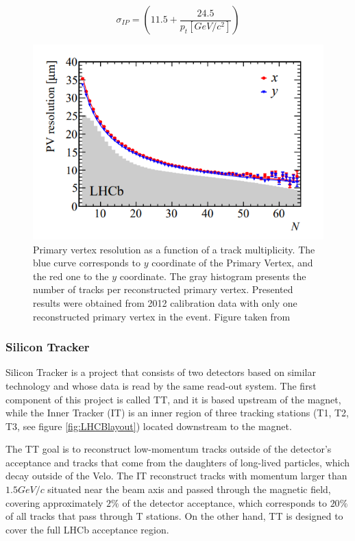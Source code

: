 \begin{equation}
    \sigma_{IP} = \left( 11.5  + \frac{24.5}{p_t[GeV/c^2]} \right)
\end{equation}



\begin{figure}[h]
\centering
\includegraphics{figures/VeloResolution.PNG}
\caption{Primary vertex resolution as a function of a track multiplicity. The blue curve corresponds to $y$ coordinate of the Primary Vertex, and the red one to the $y$ coordinate. The gray histogram presents the number of tracks per reconstructed primary vertex. Presented results were obtained from 2012 calibration data with only one reconstructed primary vertex in the event. Figure taken from \cite{veloPerformance} 
\label{fig:veloPerformance}}
\end{figure}

\subsubsection{Silicon Tracker}

Silicon Tracker \cite{Silicon_Tracker} is a project that consists of two detectors based on similar technology and whose data is read by the same read-out system. The first component of this project is called TT, and it is based upstream of the magnet, while the Inner Tracker (IT) is an inner region of three tracking stations (T1, T2, T3, see figure \ref{fig:LHCBlayout}) located downstream to the magnet.

The TT goal is to reconstruct low-momentum tracks outside of the detector's acceptance and tracks that come from the daughters of long-lived particles, which decay outside of the Velo. The IT reconstruct tracks with momentum larger than $1.5 GeV/c$ situated near the beam axis and passed through the magnetic field, covering approximately $2\%$ of the detector acceptance, which corresponds to $20\%$ of all tracks that pass through T stations. On the other hand, TT is designed to cover the full LHCb acceptance region.  

